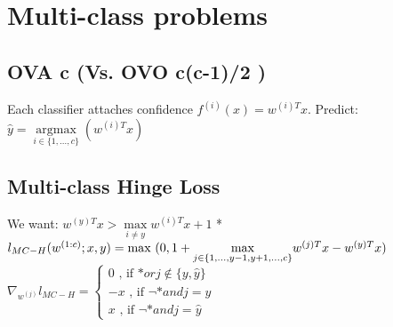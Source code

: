 \section*{Multi-class problems}
\subsection*{OVA c (Vs. OVO c(c-1)/2 )}
Each classifier attaches confidence $f^{(i)}(x)=w^{(i)T}x$. Predict: $\hat{y}=\underset{i\in\{1,...,c\}}{\operatorname{argmax}}(w^{(i)T}x)$


\subsection*{Multi-class Hinge Loss}
We want: $w^{(y)T}x > \underset{i \ne y}{\operatorname{max}} w^{(i)T}x+1$ *\\
$l_{MC-H}(w^{(1:c)};x,y) =\\
\text{max } (0,1+\underset{j\in\{1,...,y-1,y+1,...,c\}}{\operatorname{max}}w^{(j)T} x - w^{(y)T} x)$\\

$\nabla_{w^{(j)}} l_{MC-H} = \begin{cases}
    0 \text{ , if $* or j $$\not\in\{y, \hat{y}\}$}\\
	    -x \text{ , if $\neg* and j=y$}\\
	        x \text{ , if $\neg* and j=\hat{y}$}
\end{cases}$

